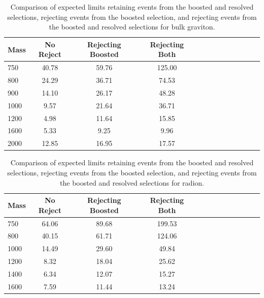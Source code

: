 \begin{table}[h]
\begin{tabular}{|l|c|c|c|c|c|c|c|c|c|c|c|c|}
\hline
Mass & No Reject & Rejecting Boosted & Rejecting Both \\ \hline
750 & 40.78 & 59.76 & 125.00\\
800 & 24.29 & 36.71 & 74.53\\
900 & 14.10 & 26.17 & 48.28\\
1000 & 9.57 & 21.64 & 36.71\\
1200 & 4.98 & 11.64 & 15.85\\
1600 & 5.33 & 9.25 & 9.96\\
2000 & 12.85 & 16.95 & 17.57\\
\hline
\end{tabular}
\caption{Comparison of expected limits retaining events from the boosted and resolved selections, rejecting events from the boosted selection, and rejecting events from the boosted and resolved selections for bulk graviton.}\label{tab:comblimBG}
\end{table}

\begin{table}[h]
\begin{tabular}{|l|c|c|c|c|c|c|c|c|c|c|c|c|}
\hline
Mass & No Reject & Rejecting Boosted & Rejecting Both \\ \hline
750 & 64.06 & 89.68 & 199.53\\
800 & 40.15 & 61.71 & 124.06\\
1000 & 14.49 & 29.60 & 49.84\\
1200 & 8.32 & 18.04 & 25.62\\
1400 &6.34 & 12.07 & 15.27\\
1600 & 7.59 & 11.44 & 13.24\\
\hline
\end{tabular}
\caption{Comparison of expected limits retaining events from the boosted and resolved selections, rejecting events from the boosted selection, and rejecting events from the boosted and resolved selections for radion.}\label{tab:comblimRad}
\end{table}

